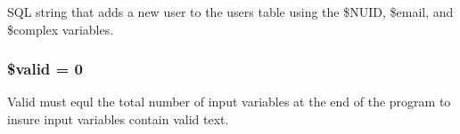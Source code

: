 \-S\-Q\-L string that adds a new user to the users table using the \$\-N\-U\-I\-D, \$email, and \$complex variables. \hypertarget{userVal_8php_a0587674d27d00ef497e08e53ccf45bbb}{
\subsubsection[{\$valid}]{\setlength{\rightskip}{0pt plus 5cm}\$valid = 0}}\label{userVal_8php_a0587674d27d00ef497e08e53ccf45bbb}
\-Valid must equl the total number of input variables at the end of the program to insure input variables contain valid text. 